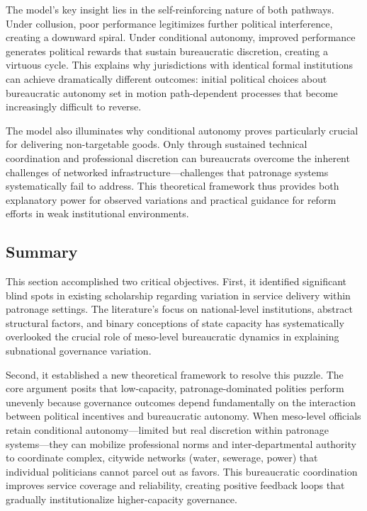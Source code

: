 The model's key insight lies in the self-reinforcing nature of both pathways. Under collusion, poor performance legitimizes further political interference, creating a downward spiral. Under conditional autonomy, improved performance generates political rewards that sustain bureaucratic discretion, creating a virtuous cycle. This explains why jurisdictions with identical formal institutions can achieve dramatically different outcomes: initial political choices about bureaucratic autonomy set in motion path-dependent processes that become increasingly difficult to reverse.

The model also illuminates why conditional autonomy proves particularly crucial for delivering non-targetable goods. Only through sustained technical coordination and professional discretion can bureaucrats overcome the inherent challenges of networked infrastructure—challenges that patronage systems systematically fail to address. This theoretical framework thus provides both explanatory power for observed variations and practical guidance for reform efforts in weak institutional environments.

\subsection*{Summary}

This section accomplished two critical objectives. First, it identified significant blind spots in existing scholarship regarding variation in service delivery within patronage settings. The literature's focus on national-level institutions, abstract structural factors, and binary conceptions of state capacity has systematically overlooked the crucial role of meso-level bureaucratic dynamics in explaining subnational governance variation.

Second, it established a new theoretical framework to resolve this puzzle. The core argument posits that low-capacity, patronage-dominated polities perform unevenly because governance outcomes depend fundamentally on the interaction between political incentives and bureaucratic autonomy. When meso-level officials retain conditional autonomy—limited but real discretion within patronage systems—they can mobilize professional norms and inter-departmental authority to coordinate complex, citywide networks (water, sewerage, power) that individual politicians cannot parcel out as favors. This bureaucratic coordination improves service coverage and reliability, creating positive feedback loops that gradually institutionalize higher-capacity governance.

